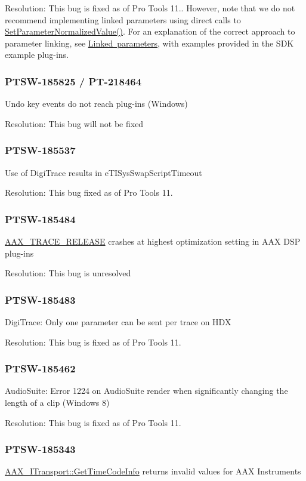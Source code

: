 Resolution\+: This bug is fixed as of Pro Tools 11.. However, note that we do not recommend implementing linked parameters using direct calls to \mbox{\hyperlink{a01669_a368b0f5a761d1eda4c41b420f153a077}{Set\+Parameter\+Normalized\+Value()}}. For an explanation of the correct approach to parameter linking, see \mbox{\hyperlink{a00824}{Linked parameters}}, with examples provided in the S\+DK example plug-\/ins.\hypertarget{a00846_PTSW-185825}{}\subsubsection{P\+T\+S\+W-\/185825 / P\+T-\/218464}\label{a00846_PTSW-185825}
Undo key events do not reach plug-\/ins (Windows)

Resolution\+: This bug will not be fixed\hypertarget{a00846_PTSW-185537}{}\subsubsection{P\+T\+S\+W-\/185537}\label{a00846_PTSW-185537}
Use of Digi\+Trace results in {\ttfamily e\+T\+I\+Sys\+Swap\+Script\+Timeout} 

Resolution\+: This bug fixed as of Pro Tools 11.\hypertarget{a00846_PTSW-185484}{}\subsubsection{P\+T\+S\+W-\/185484}\label{a00846_PTSW-185484}
\mbox{\hyperlink{a00395_ac2aa820ece56bb59140ad561218db4b3}{A\+A\+X\+\_\+\+T\+R\+A\+C\+E\+\_\+\+R\+E\+L\+E\+A\+SE}} crashes at highest optimization setting in A\+AX D\+SP plug-\/ins

Resolution\+: This bug is unresolved\hypertarget{a00846_PTSW-185483}{}\subsubsection{P\+T\+S\+W-\/185483}\label{a00846_PTSW-185483}
Digi\+Trace\+: Only one parameter can be sent per trace on H\+DX

Resolution\+: This bug is fixed as of Pro Tools 11.\hypertarget{a00846_PTSW-185462}{}\subsubsection{P\+T\+S\+W-\/185462}\label{a00846_PTSW-185462}
Audio\+Suite\+: Error 1224 on Audio\+Suite render when significantly changing the length of a clip (Windows 8)

Resolution\+: This bug is fixed as of Pro Tools 11.\hypertarget{a00846_PTSW-185343}{}\subsubsection{P\+T\+S\+W-\/185343}\label{a00846_PTSW-185343}
\mbox{\hyperlink{a01885_a3babe261ec37aa4a61c4cbd74f123bc0}{A\+A\+X\+\_\+\+I\+Transport\+::\+Get\+Time\+Code\+Info}} returns invalid values for A\+AX Instruments

